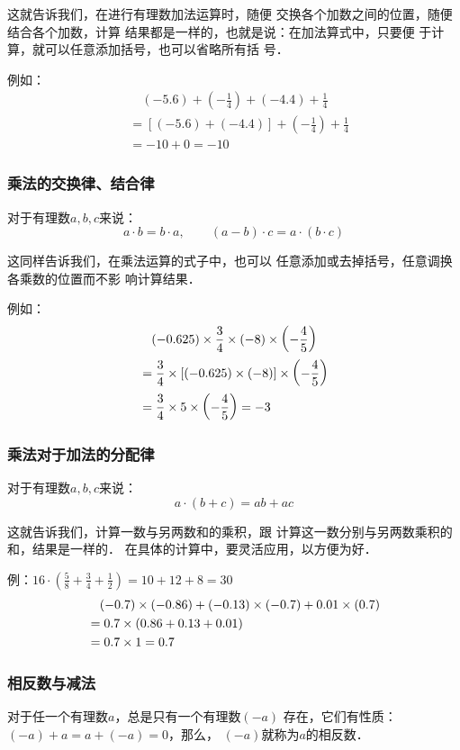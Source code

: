 这就告诉我们，在进行有理数加法运算时，随便
交换各个加数之间的位置，随便结合各个加数，计算
结果都是一样的，也就是说：在加法算式中，只要便
于计算，就可以任意添加括号，也可以省略所有括
号．

例如：
\[\begin{split}
&\quad (-5.6)+\left(-\frac{1}{4}\right)+(-4.4)+\frac{1}{4}\\
&=[(-5.6)+(-4.4)]+\left(-\frac{1}{4}\right)+\frac{1}{4}\\
&=-10+0=-10
\end{split}\]

\subsubsection{乘法的交换律、结合律}
\begin{blk}{}
	对于有理数$a, b, c$来说：
	\[ a\cdot b=b\cdot a,\qquad   (a-b)\cdot c=a\cdot  (b\cdot  c)\]
\end{blk}


这同样告诉我们，在乘法运算的式子中，也可以
任意添加或去掉括号，任意调换各乘数的位置而不影
响计算结果．

例如：\[\begin{split}
&\quad  (-0.625)\times\dfrac{3}{4}\times(-8)\times\left(-\dfrac{4}{5}\right)\\
&=\dfrac{3}{4}\times[(-0.625)\times(-8)]\times\left(-\dfrac{4}{5}\right)\\
&=\dfrac{3}{4}\times5\times\left(-\dfrac{4}{5}\right)=-3
\end{split}\]


\subsubsection{乘法对于加法的分配律}
\begin{blk}{}
	对于有理数$a,  b,  c$来说：
	\[ a\cdot (b+c)=ab+ac\]
\end{blk}

这就告诉我们，计算一数与另两数和的乘积，跟
计算这一数分别与另两数乘积的和，结果是一样的．
在具体的计算中，要灵活应用，以方便为好．

例：$16\cdot \left(\frac{5}{8}+\frac{3}{4}+\frac{1}{2}\right)=10+12+8=30$
\[\begin{split}
&\quad (-0.7)\times (-0.86)+(-0.13)\times (-0.7)+0.01\times (0.7)\\
&=0.7\times (0.86+0.13+0.01)\\
&=0.7\times 1=0.7
\end{split}\]

\subsubsection{相反数与减法}
\begin{blk}{}
	对于任一个有理数$a$，总是只有一个有理数$(-a)$
	存在，它们有性质：$(-a) +a=a+(-a)=0$，那么，
	$(-a)$就称为$a$的相反数．
\end{blk}


